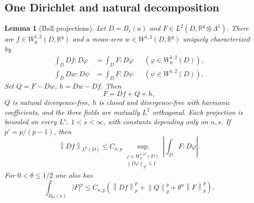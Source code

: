 \documentclass[reqno,11pt]{amsart}
\numberwithin{equation}{section}
\newtheorem{lemma}[theorem]{Lemma}
\theoremstyle{definition}
\theoremstyle{remark}
\newcommand{\R}{\mathbb R}
\newcommand{\norm}[1]{\left\lVert#1\right\rVert}
\begin{document}
\subsection{One Dirichlet and natural decomposition}\label{sec:projection}
\begin{lemma}[Ball projections]\label{lem:projection}
Let $D=B_r(a)$ and $F\in L^2(D,\R^q\otimes\Lambda^1)$. There are
$f\in W^{1,2}_0(D,\R^q)$ and a mean-zero $w\in W^{1,2}(D,\R^q)$
uniquely characterized by
\begin{align}
 \int_D Df:D\varphi&=\int_D F:D\varphi
                &&(\varphi\in W^{1,2}_0(D)),\label{eq:dir-proj}\\
 \int_D Dw:D\psi&=\int_D F:D\psi
                &&(\psi\in W^{1,2}(D)).\label{eq:neu-proj}
\end{align}
Set $Q=F-Dw$, $h=Dw-Df$. Then
\begin{equation}\label{eq:decomposition}
 F=Df+Q+h,
\end{equation}
$Q$ is natural divergence-free, $h$ is closed and divergence-free with
harmonic coefficients, and the three fields are mutually $L^2$ orthogonal.
Each projection is bounded on every $L^s$, $1<s<\infty$, with constants
depending only on $n,s$. If $p'=p/(p-1)$, then
\begin{equation}\label{eq:dirichlet-duality}
 \norm{Df}_{L^p(D)}\leq C_{n,p}
 \sup_{\substack{\varphi\in W^{1,p'}_0(D)\\\norm{D\varphi}_{p'}\leq1}}
       \left|\int_D F:D\varphi\right|.
\end{equation}
For $0<\theta\leq1/2$ one also has
\begin{equation}\label{eq:projection-small-ball}
 \int_{B_{\theta r}(a)}|F|^p
 \leq C_{n,p}\left(\norm{Df}_p^p+\norm Q_p^p
                    +\theta^n\norm F_p^p\right).
\end{equation}
\end{lemma}
\end{document}
